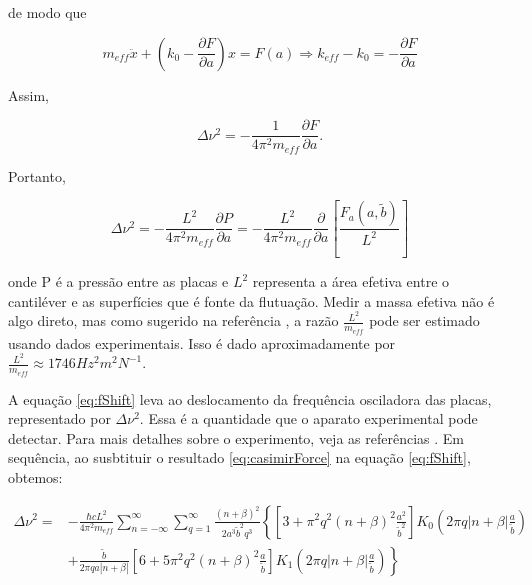de modo que 

\begin{equation}
    m_{eff} \ddot{x} + \left(  k_0 - \frac{\partial F}{\partial a} \right) x = F(a) \Rightarrow k_{eff} - k_0 = -\frac{\partial F}{\partial a}
\end{equation}

Assim,

\begin{equation}
    \Delta \nu^2 = - \frac{1}{4\pi^2 m_{eff}} \frac{\partial F}{\partial a}.
\end{equation}

Portanto,

\begin{equation}
        \Delta \nu^2 = - \frac{L^2}{4\pi^2 m_{eff}} \frac{\partial P}{\partial a} = - \frac{L^2}{4\pi^2 m_{eff}} \frac{\partial }{\partial a} \left[ \frac{F_a(a, \tilde{b})}{L^2} \right] \label{eq:fShift}
\end{equation}

onde P é a pressão entre as placas e $L^2$ representa a área efetiva entre o cantiléver e as superfícies que é fonte da flutuação. Medir a massa efetiva não é algo direto, mas como sugerido na referência \cite{Bressi2000}, a razão $\frac{L^2}{m_{eff}}$ pode ser estimado usando dados experimentais. Isso é dado aproximadamente por $\frac{L^2}{m_{eff}} \approx 1746 Hz^2m^2N^{-1}$.

A equação \eqref{eq:fShift} leva ao deslocamento da frequência osciladora das placas, representado por $\Delta \nu^2$. Essa é a quantidade que o aparato experimental pode detectar. Para mais detalhes sobre o experimento, veja as referências \cite{Bressi2000,Bressi2002}. Em sequência, ao susbtituir o resultado \eqref{eq:casimirForce} na equação \eqref{eq:fShift}, obtemos:

\begin{equation}
    \begin{aligned}
    \Delta \nu^2 =& - \frac{\hbar cL^2}{4 \pi^2 m_{eff}} \sum_{n=-\infty}^{\infty} \sum_{q=1}^{\infty} \frac{(n + \beta)^2}{2a^3\tilde{b}^2q^3} \left\{ \left[ 3 + \pi^2q^2(n + \beta)^2 \frac{a^2}{\tilde{b}^2}\right] K_ 0 \left( 2\pi q |n + \beta|\frac{a}{\tilde{b}} \right) \right. \\
    &+ \left. \frac{\tilde{b}}{2\pi qa |n + \beta|} \left[ 6 + 5\pi^2q^2(n + \beta)^2 \frac{a}{\tilde{b}} \right] K_ 1 (2\pi q |n + \beta| \frac{a}{\tilde{b}}) \right\} \label{eq:fShiftWithForce}
    \end{aligned}
\end{equation}

